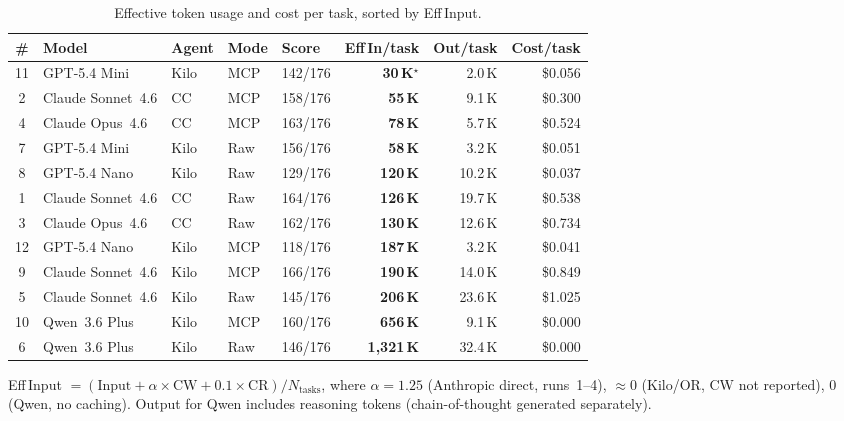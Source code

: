 \begin{table}[h]
\centering
\small
\caption{Effective token usage and cost per task, sorted by Eff\,Input.}\label{tab:tokens}
\setlength{\tabcolsep}{4pt}
\begin{tabular}{cllllrrr}
\toprule
\textbf{\#} & \textbf{Model} & \textbf{Agent} & \textbf{Mode}
  & \textbf{Score} & \textbf{Eff\,In/task} & \textbf{Out/task} & \textbf{Cost/task} \\
\midrule
11 & GPT-5.4 Mini      & Kilo & MCP & 142/176 & \textbf{30\,K}$^\star$ &  2.0\,K & \$0.056 \\
 2 & Claude Sonnet~4.6 & CC   & MCP & 158/176 & \textbf{55\,K} &  9.1\,K & \$0.300 \\
 4 & Claude Opus~4.6   & CC   & MCP & 163/176 & \textbf{78\,K} &  5.7\,K & \$0.524 \\
 7 & GPT-5.4 Mini      & Kilo & Raw & 156/176 & \textbf{58\,K} &  3.2\,K & \$0.051 \\
 8 & GPT-5.4 Nano      & Kilo & Raw & 129/176 & \textbf{120\,K} & 10.2\,K & \$0.037 \\
 1 & Claude Sonnet~4.6 & CC   & Raw & 164/176 & \textbf{126\,K} & 19.7\,K & \$0.538 \\
 3 & Claude Opus~4.6   & CC   & Raw & 162/176 & \textbf{130\,K} & 12.6\,K & \$0.734 \\
12 & GPT-5.4 Nano      & Kilo & MCP & 118/176 & \textbf{187\,K} &  3.2\,K & \$0.041 \\
 9 & Claude Sonnet~4.6 & Kilo & MCP & 166/176 & \textbf{190\,K} & 14.0\,K & \$0.849 \\
 5 & Claude Sonnet~4.6 & Kilo & Raw & 145/176 & \textbf{206\,K} & 23.6\,K & \$1.025 \\
10 & Qwen~3.6 Plus     & Kilo & MCP & 160/176 & \textbf{656\,K} &  9.1\,K & \$0.000 \\
 6 & Qwen~3.6 Plus     & Kilo & Raw & 146/176 & \textbf{1,321\,K} & 32.4\,K & \$0.000 \\
\bottomrule
\end{tabular}
\end{table}

\noindent
Eff\,Input $= (\text{Input} + \alpha \times \text{CW} + 0.1 \times \text{CR}) / N_{\text{tasks}}$,
where $\alpha=1.25$ (Anthropic direct, runs~1--4), $\approx0$ (Kilo/OR, CW not reported),
$0$ (Qwen, no caching).
Output for Qwen includes reasoning tokens (chain-of-thought generated separately).

